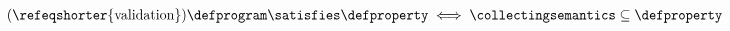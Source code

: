 \begin{definition*}
  \begin{align} \tag{\refeqshorter{validation}}
    \defprogram \satisfies \defproperty \iff \collectingsemantics \subseteq \defproperty
  \end{align}
\end{definition*}
